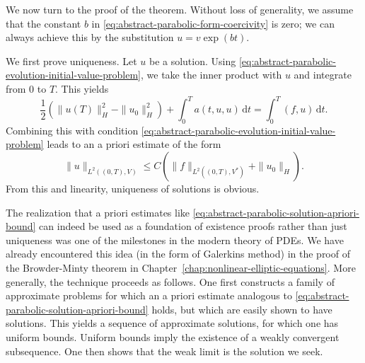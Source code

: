We now turn to the proof of the theorem. Without loss of generality, we assume that the constant $b$ in \eqref{eq:abstract-parabolic-form-coercivity} is zero; we can always achieve this by the substitution $u=v\exp(bt)$.\par We first prove uniqueness. Let $u$ be a solution. Using \eqref{eq:abstract-parabolic-evolution-initial-value-problem}, we take the inner product with $u$ and integrate from 0 to $T$. This yields
\begin{equation}\label{eq:abstract-parabolic-solution-energy-identity}
\dfrac{1}{2}(\|u(T)\|_H^2-\|u_0\|_H^2)+\int_0^T a(t,u,u)\,\mathrm{d}t=\int_0^T(f,u)\,\mathrm{d}t.
\end{equation}
Combining this with condition \eqref{eq:abstract-parabolic-evolution-initial-value-problem} leads to an a priori estimate of the form
\begin{equation}\label{eq:abstract-parabolic-solution-apriori-bound}
\|u\|_{L^2((0,T),V)}\leq C(\|f\|_{L^2((0,T),V^*)}+\|u_0\|_H).
\end{equation}
From this and linearity, uniqueness of solutions is obvious.

The realization that a priori estimates like \eqref{eq:abstract-parabolic-solution-apriori-bound} can indeed be used as a foundation of existence proofs rather than just uniqueness was one of the milestones in the modern theory of PDEs. We have already encountered this idea (in the form of Galerkin\textquotesingle s method) in the proof of the Browder-Minty theorem in Chapter~\ref{chap:nonlinear-elliptic-equations}. More generally, the technique proceeds as follows. One first constructs a family of approximate problems for which an a priori estimate analogous to \eqref{eq:abstract-parabolic-solution-apriori-bound} holds, but which are easily shown to have solutions. This yields a sequence of approximate solutions, for which one has uniform bounds. Uniform bounds imply the existence of a weakly convergent subsequence. One then shows that the weak limit is the solution we seek.

